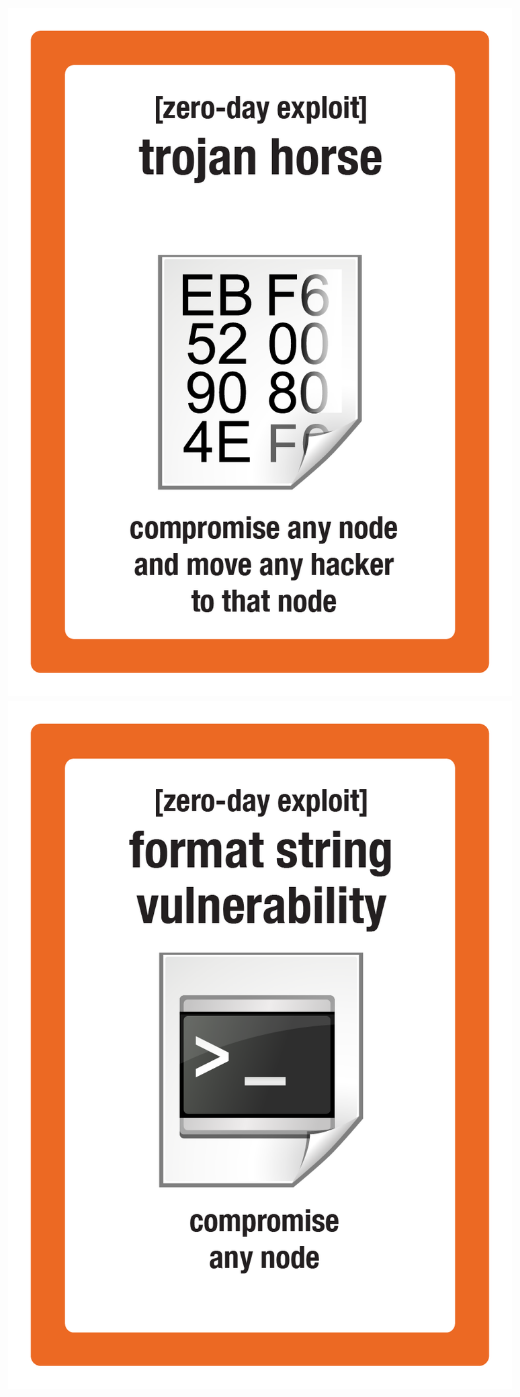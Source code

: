 \documentclass{letter}
\begin{document}
\includegraphics{lo0t/lo0t.exploit_trojan_horse}
\includegraphics{lo0t/lo0t.exploit_format_string_vuln}
\end{document}
